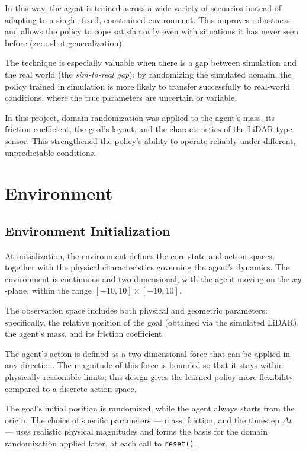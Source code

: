 \documentclass[11pt]{article}
\begin{document}
In this way, the agent is trained across a wide variety of scenarios instead of adapting to a single,
fixed, constrained environment. This improves robustness and allows the policy to cope satisfactorily
even with situations it has never seen before (zero-shot generalization).

The technique is especially valuable when there is a gap between simulation and the real world (the
\emph{sim-to-real gap}): by randomizing the simulated domain, the policy trained in simulation is more
likely to transfer successfully to real-world conditions, where the true parameters are uncertain or
variable.

In this project, domain randomization was applied to the agent's mass, its friction coefficient, the
goal's layout, and the characteristics of the LiDAR-type sensor. This strengthened the policy's ability
to operate reliably under different, unpredictable conditions.

\section{Environment}

\subsection{Environment Initialization}

At initialization, the environment defines the core state and action spaces, together with the physical
characteristics governing the agent's dynamics. The environment is continuous and two-dimensional, with
the agent moving on the $xy$-plane, within the range $[-10,10]\times[-10,10]$.

The observation space includes both physical and geometric parameters: specifically, the relative
position of the goal (obtained via the simulated LiDAR), the agent's mass, and its friction coefficient.

The agent's action is defined as a two-dimensional force that can be applied in any direction. The
magnitude of this force is bounded so that it stays within physically reasonable limits; this design
gives the learned policy more flexibility compared to a discrete action space.

The goal's initial position is randomized, while the agent always starts from the origin. The choice of
specific parameters --- mass, friction, and the timestep $\Delta t$ --- uses realistic physical
magnitudes and forms the basis for the domain randomization applied later, at each call to
\texttt{reset()}.
\end{document}
